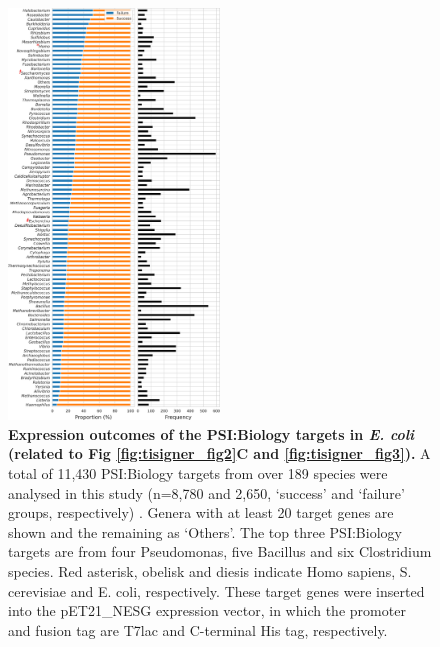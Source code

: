 \begin{figure}
	\includegraphics[width=0.5\textwidth]{appendix/TIsigner/Figs/S7.png}
	\caption[ Expression outcomes of the PSI:Biology targets in E. coli (related to Fig 2C and 3). ]{\textbf{ Expression outcomes of the PSI:Biology targets in \textit{E. coli} (related to Fig \ref{fig:tisigner_fig2}C and \ref{fig:tisigner_fig3}). } A total of 11,430 PSI:Biology targets from over 189 species were analysed in this study (n=8,780 and 2,650, ‘success’ and ‘failure’ groups, respectively) \cite{Chen2004-is,Seiler2014-ox,Acton2005-sr}. Genera with at least 20 target genes are shown and the remaining as ‘Others’. The top three PSI:Biology targets are from four Pseudomonas, five Bacillus and six Clostridium species. Red asterisk, obelisk and diesis indicate Homo sapiens, S. cerevisiae and E. coli, respectively. These target genes were inserted into the pET21\_NESG expression vector, in which the promoter and fusion tag are T7lac and C-terminal His tag, respectively.}
	\label{fig:appendix_TIsigner_S7}
\end{figure}



